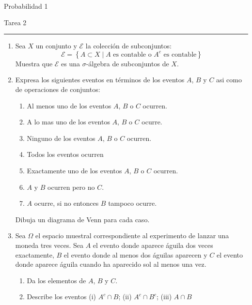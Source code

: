 \documentclass[12pt]{extreport}
\begin{document}
\begin{center}
    \textsf{\Large Probabilidad 1}
    \par\medskip
    \textsf{\large Tarea 2}
\end{center}
\hrule
\par\bigskip

\begin{enumerate}
    \item Sea $X$ un conjunto y $\mathcal{E}$ la colección de subconjuntos:
          $$
              \mathcal{E} = \left\{A\subset X \mid A \text{ es contable o } A^c \text{ es contable}  \right\}
          $$
          Muestra que $\mathcal{E}$ es una $\sigma$-álgebra de subconjuntos de $X$.
    \item Expresa los siguientes eventos en términos de los eventos $A$, $B$ y $C$ asi como de operaciones de conjuntos:
          \begin{enumerate}
              \item Al menos uno de los eventos $A$, $B$ o $C$ ocurren.
              \item A lo mas uno de los eventos $A$, $B$ o $C$ ocurre.
              \item Ninguno de los eventos $A$, $B$ o $C$ ocurren.
              \item Todos los eventos ocurren
              \item Exactamente uno de los eventos $A$, $B$ o $C$ ocurren.
              \item $A$ y $B$ ocurren pero no $C$.
              \item $A$ ocurre, si no entonces $B$ tampoco ocurre.
          \end{enumerate}
          Dibuja un diagrama de Venn para cada caso.
    \item Sea $\Omega$ el espacio muestral correspondiente al experimento de lanzar una moneda tres veces. Sea $A$ el evento donde aparece águila dos veces exactamente, $B$ el evento donde al menos dos águilas aparecen y $C$ el evento donde aparece águila cuando ha aparecido sol al menos una vez.
          \begin{enumerate}
              \item Da los elementos de $A$, $B$ y $C$.
              \item Describe los eventos (i) $A^c\cap B$; (ii) $A^c\cap B^c$; (iii) $A\cap B$
          \end{enumerate}

\end{enumerate}
\end{document}
